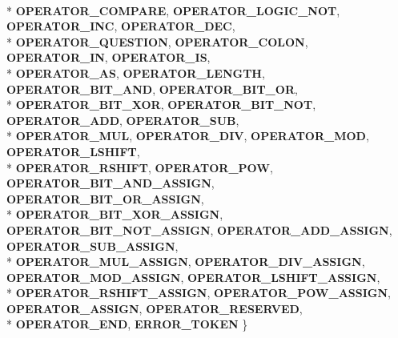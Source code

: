 \begin{DoxyCompactItemize}
\\*
{\bfseries O\+P\+E\+R\+A\+T\+O\+R\+\_\+\+C\+O\+M\+P\+A\+RE}, 
{\bfseries O\+P\+E\+R\+A\+T\+O\+R\+\_\+\+L\+O\+G\+I\+C\+\_\+\+N\+OT}, 
{\bfseries O\+P\+E\+R\+A\+T\+O\+R\+\_\+\+I\+NC}, 
{\bfseries O\+P\+E\+R\+A\+T\+O\+R\+\_\+\+D\+EC}, 
\\*
{\bfseries O\+P\+E\+R\+A\+T\+O\+R\+\_\+\+Q\+U\+E\+S\+T\+I\+ON}, 
{\bfseries O\+P\+E\+R\+A\+T\+O\+R\+\_\+\+C\+O\+L\+ON}, 
{\bfseries O\+P\+E\+R\+A\+T\+O\+R\+\_\+\+IN}, 
{\bfseries O\+P\+E\+R\+A\+T\+O\+R\+\_\+\+IS}, 
\\*
{\bfseries O\+P\+E\+R\+A\+T\+O\+R\+\_\+\+AS}, 
{\bfseries O\+P\+E\+R\+A\+T\+O\+R\+\_\+\+L\+E\+N\+G\+TH}, 
{\bfseries O\+P\+E\+R\+A\+T\+O\+R\+\_\+\+B\+I\+T\+\_\+\+A\+ND}, 
{\bfseries O\+P\+E\+R\+A\+T\+O\+R\+\_\+\+B\+I\+T\+\_\+\+OR}, 
\\*
{\bfseries O\+P\+E\+R\+A\+T\+O\+R\+\_\+\+B\+I\+T\+\_\+\+X\+OR}, 
{\bfseries O\+P\+E\+R\+A\+T\+O\+R\+\_\+\+B\+I\+T\+\_\+\+N\+OT}, 
{\bfseries O\+P\+E\+R\+A\+T\+O\+R\+\_\+\+A\+DD}, 
{\bfseries O\+P\+E\+R\+A\+T\+O\+R\+\_\+\+S\+UB}, 
\\*
{\bfseries O\+P\+E\+R\+A\+T\+O\+R\+\_\+\+M\+UL}, 
{\bfseries O\+P\+E\+R\+A\+T\+O\+R\+\_\+\+D\+IV}, 
{\bfseries O\+P\+E\+R\+A\+T\+O\+R\+\_\+\+M\+OD}, 
{\bfseries O\+P\+E\+R\+A\+T\+O\+R\+\_\+\+L\+S\+H\+I\+FT}, 
\\*
{\bfseries O\+P\+E\+R\+A\+T\+O\+R\+\_\+\+R\+S\+H\+I\+FT}, 
{\bfseries O\+P\+E\+R\+A\+T\+O\+R\+\_\+\+P\+OW}, 
{\bfseries O\+P\+E\+R\+A\+T\+O\+R\+\_\+\+B\+I\+T\+\_\+\+A\+N\+D\+\_\+\+A\+S\+S\+I\+GN}, 
{\bfseries O\+P\+E\+R\+A\+T\+O\+R\+\_\+\+B\+I\+T\+\_\+\+O\+R\+\_\+\+A\+S\+S\+I\+GN}, 
\\*
{\bfseries O\+P\+E\+R\+A\+T\+O\+R\+\_\+\+B\+I\+T\+\_\+\+X\+O\+R\+\_\+\+A\+S\+S\+I\+GN}, 
{\bfseries O\+P\+E\+R\+A\+T\+O\+R\+\_\+\+B\+I\+T\+\_\+\+N\+O\+T\+\_\+\+A\+S\+S\+I\+GN}, 
{\bfseries O\+P\+E\+R\+A\+T\+O\+R\+\_\+\+A\+D\+D\+\_\+\+A\+S\+S\+I\+GN}, 
{\bfseries O\+P\+E\+R\+A\+T\+O\+R\+\_\+\+S\+U\+B\+\_\+\+A\+S\+S\+I\+GN}, 
\\*
{\bfseries O\+P\+E\+R\+A\+T\+O\+R\+\_\+\+M\+U\+L\+\_\+\+A\+S\+S\+I\+GN}, 
{\bfseries O\+P\+E\+R\+A\+T\+O\+R\+\_\+\+D\+I\+V\+\_\+\+A\+S\+S\+I\+GN}, 
{\bfseries O\+P\+E\+R\+A\+T\+O\+R\+\_\+\+M\+O\+D\+\_\+\+A\+S\+S\+I\+GN}, 
{\bfseries O\+P\+E\+R\+A\+T\+O\+R\+\_\+\+L\+S\+H\+I\+F\+T\+\_\+\+A\+S\+S\+I\+GN}, 
\\*
{\bfseries O\+P\+E\+R\+A\+T\+O\+R\+\_\+\+R\+S\+H\+I\+F\+T\+\_\+\+A\+S\+S\+I\+GN}, 
{\bfseries O\+P\+E\+R\+A\+T\+O\+R\+\_\+\+P\+O\+W\+\_\+\+A\+S\+S\+I\+GN}, 
{\bfseries O\+P\+E\+R\+A\+T\+O\+R\+\_\+\+A\+S\+S\+I\+GN}, 
{\bfseries O\+P\+E\+R\+A\+T\+O\+R\+\_\+\+R\+E\+S\+E\+R\+V\+ED}, 
\\*
{\bfseries O\+P\+E\+R\+A\+T\+O\+R\+\_\+\+E\+ND}, 
{\bfseries E\+R\+R\+O\+R\+\_\+\+T\+O\+K\+EN}
 \}\hypertarget{class_object_script_1_1_o_s_1_1_core_1_1_tokenizer_a918733f6e7e2d27c7de8a28227644770}{}\label{class_object_script_1_1_o_s_1_1_core_1_1_tokenizer_a918733f6e7e2d27c7de8a28227644770}

\end{DoxyCompactItemize}
